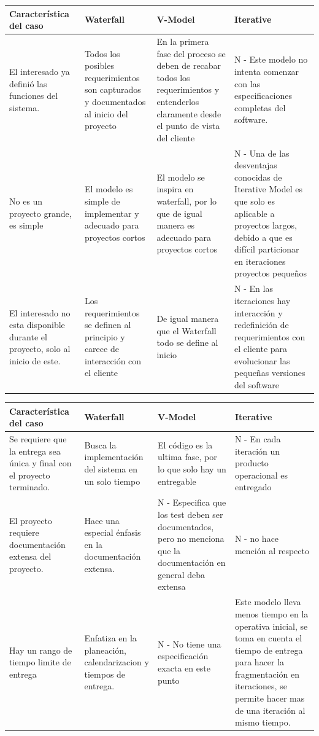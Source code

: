 \documentclass[spanish,12pt,letterpapper]{article}
\begin{document}
   \begin{tabular}{|p{3cm}|p{3cm}|p{3cm}|p{3cm}|}
   \hline
   \textbf{Característica del caso} & \textbf{Waterfall} & \textbf{V-Model} & \textbf{Iterative} \\
   \hline
   El interesado ya definió las funciones del sistema. & Todos los posibles requerimientos son capturados y documentados al inicio del proyecto & En la primera fase del proceso se deben de recabar todos los requerimientos y entenderlos claramente desde el punto de vista del cliente & N - Este modelo no intenta comenzar con las especificaciones completas del software.\\
   \hline
   No es un proyecto grande, es simple & El modelo es simple de implementar y adecuado para proyectos cortos & El modelo se inspira en waterfall, por lo que de igual manera es adecuado para proyectos cortos & N - Una de las desventajas conocidas de Iterative Model es que solo es aplicable a proyectos largos, debido a que es difícil particionar en iteraciones proyectos pequeños\\
   \hline
   El interesado no esta disponible durante el proyecto, solo al inicio de este. & Los requerimientos se definen al principio y carece de interacción con el cliente & De igual manera que el Waterfall todo se define al inicio & N - En las iteraciones hay interacción y redefinición de requerimientos con el cliente para evolucionar las pequeñas versiones del software \\
   \hline
   \end{tabular}
   
   \pagebreak

   \begin{tabular}{|p{3cm}|p{3cm}|p{3cm}|p{3cm}|}
   \hline
   \textbf{Característica del caso} & \textbf{Waterfall} & \textbf{V-Model} & \textbf{Iterative} \\
   \hline
   Se requiere que la entrega sea única y final con el proyecto terminado. & Busca la implementación del sistema en un solo tiempo & El código es la ultima fase, por lo que solo hay un entregable & N - En cada iteración un producto operacional es entregado\\
   \hline
   El proyecto requiere documentación extensa del proyecto. & Hace una especial énfasis en la documentación extensa. & N - Especifica que los test deben ser documentados, pero no menciona que la documentación en general deba extensa & N - no hace mención al respecto\\
      \hline
Hay un rango de tiempo limite de entrega & Enfatiza en la planeación, calendarizacion y tiempos de entrega. & N - No tiene una especificación exacta en este punto & Este modelo lleva menos tiempo en la operativa inicial, se toma en cuenta el tiempo de entrega para hacer la fragmentación en iteraciones, se permite hacer mas de una iteración al mismo tiempo. \\
   \hline
   \end{tabular}
   
\end{document}
